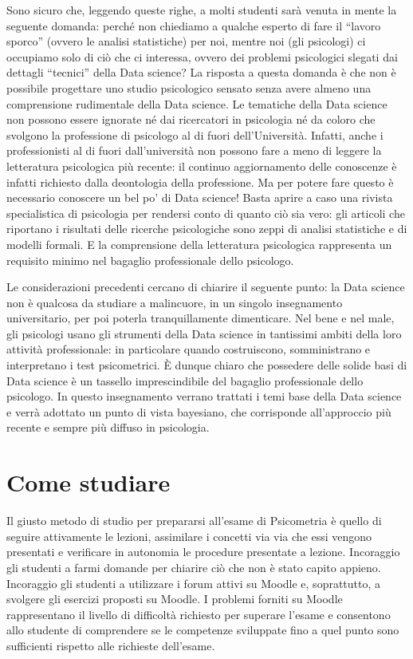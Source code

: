 \documentclass[
  11pt,
]{krantz}
\begin{document}
Sono sicuro che, leggendo queste righe, a molti studenti sarà venuta in mente la seguente domanda: perché non chiediamo a qualche esperto di fare il ``lavoro sporco'' (ovvero le analisi statistiche) per noi, mentre noi (gli psicologi) ci occupiamo solo di ciò che ci interessa, ovvero dei problemi psicologici slegati dai dettagli ``tecnici'' della Data science? La risposta a questa domanda è che non è possibile progettare uno studio psicologico sensato senza avere almeno una comprensione rudimentale della Data science. Le tematiche della Data science non possono essere ignorate né dai ricercatori in psicologia né da coloro che svolgono la professione di psicologo al di fuori dell'Università. Infatti, anche i professionisti al di fuori dall'università non possono fare a meno di leggere la letteratura psicologica più recente: il continuo aggiornamento delle conoscenze è infatti richiesto dalla deontologia della professione. Ma per potere fare questo è necessario conoscere un bel po' di Data science! Basta aprire a caso una rivista specialistica di psicologia per rendersi conto di quanto ciò sia vero: gli articoli che riportano i risultati delle ricerche psicologiche sono zeppi di analisi statistiche e di modelli formali. E la comprensione della letteratura psicologica rappresenta un requisito minimo nel bagaglio professionale dello psicologo.

Le considerazioni precedenti cercano di chiarire il seguente punto: la Data science non è qualcosa da studiare a malincuore, in un singolo insegnamento universitario, per poi poterla tranquillamente dimenticare. Nel bene e nel male, gli psicologi usano gli strumenti della Data science in tantissimi ambiti della loro attività professionale: in particolare quando costruiscono, somministrano e interpretano i test psicometrici. È dunque chiaro che possedere delle solide basi di Data science è un tassello imprescindibile del bagaglio professionale dello psicologo. In questo insegnamento verrano trattati i temi base della Data science e verrà adottato un punto di vista bayesiano, che corrisponde all'approccio più recente e sempre più diffuso in psicologia.

\hypertarget{come-studiare}{%
\section*{Come studiare}\label{come-studiare}}


Il giusto metodo di studio per prepararsi all'esame di Psicometria è quello di seguire attivamente le lezioni, assimilare i concetti via via che essi vengono presentati e verificare in autonomia le procedure presentate a lezione. Incoraggio gli studenti a farmi domande per chiarire ciò che non è stato capito appieno. Incoraggio gli studenti a utilizzare i forum attivi su Moodle e, soprattutto, a svolgere gli esercizi proposti su Moodle. I problemi forniti su Moodle rappresentano il livello di difficoltà richiesto per superare l'esame e consentono allo studente di comprendere se le competenze sviluppate fino a quel punto sono sufficienti rispetto alle richieste dell'esame.
\end{document}
